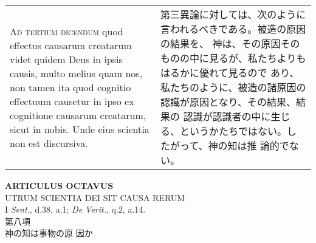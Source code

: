 \documentclass[10pt]{jsarticle} %
\begin{document}
\begin{longtable}{p{21em}p{21em}}
\\


{\scshape Ad tertium dicendum} quod effectus causarum creatarum videt
quidem Deus in ipsis causis, multo melius quam nos, non tamen ita quod
cognitio effectuum causetur in ipso ex cognitione causarum creatarum,
sicut in nobis. Unde eius scientia non est discursiva.

&

第三異論に対しては、次のように言われるべきである。被造の原因の結果を、
神は、その原因そのものの中に見るが、私たちよりもはるかに優れて見るので
あり、私たちのように、被造の諸原因の認識が原因となり、その結果、結果の
認識が認識者の中に生じる、というかたちではない。したがって、神の知は推
論的でない。


\end{longtable}
\newpage




\begin{center}
{\Large {\bf ARTICULUS OCTAVUS}}\\ {\large UTRUM SCIENTIA DEI SIT
CAUSA RERUM}\\ {\footnotesize I {\itshape Sent.}, d.38, a.1;
{\itshape De Verit.}, q.2, a.14.}\\ {\Large 第八項\\神の知は事物の原
因か}
\end{center}
\end{document}
